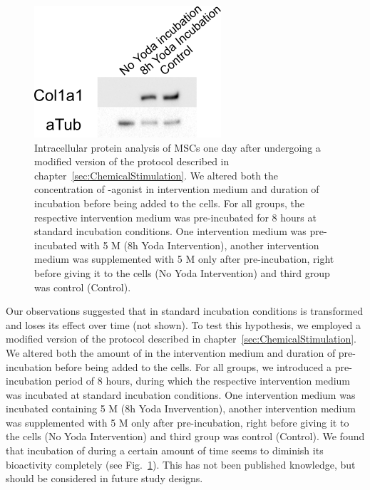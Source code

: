 \begin{figure}
	\centering
	\includegraphics[width = 0.4\linewidth{}]{Inkubationshypothese.png}
	\caption{Intracellular protein analysis of MSCs one day after undergoing a modified version of the protocol described in chapter~\ref{sec:ChemicalStimulation}. We altered both the concentration of \Piezo{}-agonist \Yoda{} in intervention medium and duration of \Yoda{} incubation before being added to the cells. For all groups, the respective intervention medium was pre-incubated for 8 hours at standard incubation conditions. One intervention medium was pre-incubated with 5 \textmu{}M \Yoda{} (8h Yoda Intervention), another intervention medium was supplemented with 5 \textmu{}M \Yoda{} only after pre-incubation, right before giving it to the cells (No Yoda Intervention) and third group was \Yoda{} control (Control).}
	\label{fig:Inkubationshypothese_Western}
\end{figure}

Our observations suggested that in standard incubation conditions \Yoda{} is transformed and loses its effect over time (not shown). To test this hypothesis, we employed a modified version of the protocol described in chapter~\ref{sec:ChemicalStimulation}. We altered both the amount of \Yoda{} in the intervention medium and duration of \Yoda{} pre-incubation before being added to the cells. For all groups, we introduced a pre-incubation period of 8 hours, during which the respective intervention medium was incubated at standard incubation conditions. One intervention medium was incubated containing 5 \mul{}M \Yoda{} (8h Yoda Invervention), another intervention medium was supplemented with 5 \mul{}M \Yoda{} only after pre-incubation, right before giving it to the cells (No Yoda Intervention) and third group was \Yoda{} control (Control). We found that incubation of \Yoda{} during a certain amount of time seems to diminish its bioactivity completely (see Fig.~\ref{fig:Inkubationshypothese_Western}). This has not been published knowledge, but should be considered in future study designs.


